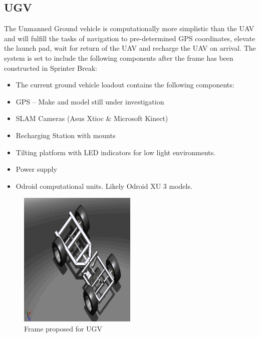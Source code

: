 \subsection{UGV}
The Unmanned Ground vehicle is computationally more simplistic than the UAV and will fulfill the tasks of navigation to pre-determined GPS coordinates, elevate the launch pad, wait for return of the UAV and recharge the UAV on arrival.  The system is set to include the following components after the frame has been constructed in Sprinter Break:\newline

  \begin{itemize}

    \item[] The current ground vehicle loadout contains the following components:
    \item GPS – Make and model still under investigation
    \item SLAM Cameras (Asus Xtioc \& Microsoft Kinect)
    \item Recharging Station with mounts
    \item Tilting platform with LED indicators for low light environments.
    \item Power supply
    \item Odroid computational units.  Likely Odroid XU 3 models.

  \end{itemize}

\begin{figure}[tbh]
\begin{center}
\includegraphics[width=0.50\textwidth]{resources/img/UGV}
\end{center}
\caption{Frame proposed for UGV \label{systemdiagram}}
\end{figure}

